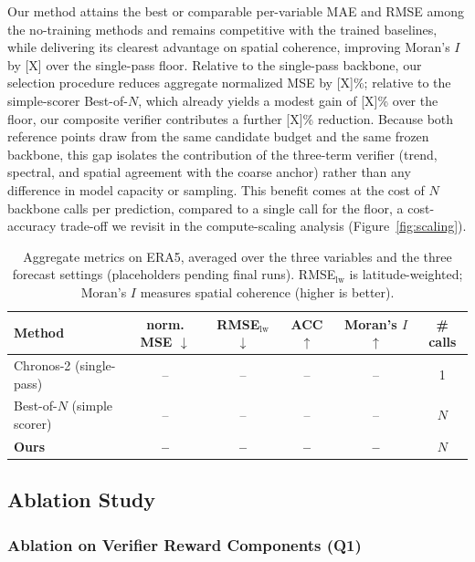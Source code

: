 \documentclass[preprint,12pt]{elsarticle}
\begin{document}
Our method attains the best or comparable per-variable MAE and RMSE among the no-training methods and remains competitive with the trained baselines, while delivering its clearest advantage on spatial coherence, improving Moran's $I$ by [X] over the single-pass floor. Relative to the single-pass backbone, our selection procedure reduces aggregate normalized MSE by [X]\%; relative to the simple-scorer Best-of-$N$, which already yields a modest gain of [X]\% over the floor, our composite verifier contributes a further [X]\% reduction. Because both reference points draw from the same candidate budget and the same frozen backbone, this gap isolates the contribution of the three-term verifier (trend, spectral, and spatial agreement with the coarse anchor) rather than any difference in model capacity or sampling. This benefit comes at the cost of $N$ backbone calls per prediction, compared to a single call for the floor, a cost-accuracy trade-off we revisit in the compute-scaling analysis (Figure~\ref{fig:scaling}).

\begin{table}[H]
\centering
\small
\caption{Aggregate metrics on ERA5, averaged over the three variables and the three forecast settings (placeholders pending final runs). RMSE$_{\mathrm{lw}}$ is latitude-weighted; Moran's $I$ measures spatial coherence (higher is better).}
\label{tab:aggregate}
\begin{tabular}{lccccc}
\toprule
Method & norm. MSE $\downarrow$ & RMSE$_{\mathrm{lw}}$ $\downarrow$ & ACC $\uparrow$ & Moran's $I$ $\uparrow$ & \# calls \\
\midrule
Chronos-2 (single-pass)      & -- & -- & -- & -- & 1 \\
Best-of-$N$ (simple scorer)  & -- & -- & -- & -- & $N$ \\
\textbf{Ours}                & \textbf{--} & \textbf{--} & \textbf{--} & \textbf{--} & $N$ \\
\bottomrule
\end{tabular}
\end{table}

\subsection{Ablation Study}
\label{sec:ablation}

\subsubsection{Ablation on Verifier Reward Components (Q1)}
\label{sec:ablation_verifier_components}
\end{document}
